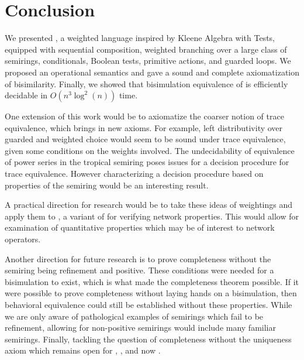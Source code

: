 \documentclass[a4paper,UKenglish,cleveref, autoref, thm-restate]{lipics-v2021}
\newcommand{\wgkat}{\textsf{\upshape{wGKAT}}\xspace}
\newcommand{\gkat}{\textsf{\upshape{GKAT}}\xspace}
\newcommand{\probgkat}{\textsf{\upshape{ProbGKAT}}\xspace}
\newcommand{\kat}{\textsf{\upshape{KAT}}\xspace}
\newcommand{\netkat}{\textsf{\upshape{NetKAT}}\xspace}
\theoremstyle{plain}\newtheoremrep{thm}{Theorem}[section]
\begin{document}
	\section{Conclusion}\label{conclS}
	We presented \wgkat, a weighted language inspired by Kleene Algebra with Tests, equipped with sequential composition, weighted branching over a large class of semirings, conditionals, Boolean tests, primitive actions, and guarded loops. We proposed an operational semantics and gave a sound and complete axiomatization of bisimilarity. Finally, we showed that bisimulation equivalence of \wgkat is efficiently decidable in $O(n^3\log^2(n))$ time. 
	
	One extension of this work would be to axiomatize the coarser notion of trace equivalence, which brings in new axioms. For example, left distributivity over guarded and weighted choice would seem to be sound under trace equivalence, given some conditions on the weights involved. The undecidability of equivalence of power series in the tropical semiring poses issues for a decision procedure for trace equivalence. However characterizing a decision procedure based on properties of the semiring would be an interesting result. 
		
	A practical direction for research would be to take these ideas of weightings and apply them to \netkat, a variant of \kat for verifying network properties. This would allow for examination of quantitative properties which may be of interest to network operators.
	
	Another direction for future research is to prove completeness without the semiring being refinement and positive. These conditions were needed for a bisimulation to exist, which is what made the completeness theorem possible. If it were possible to prove completeness without laying hands on a bisimulation, then behavioral equivalence could still be established without these properties. While we are only aware of pathological examples of semirings which fail to be refinement, allowing for non-positive semirings would include many familiar semirings. Finally, tackling the question of completeness without the uniqueness axiom which remains open for \gkat, \probgkat, and now \wgkat. 


\end{document}
